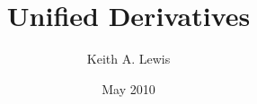 \documentclass[11pt]{amsbook}
\begin{document}
 

\author{Keith A. Lewis} 
\title{Unified Derivatives} 
\date{May 2010} 

\frontmatter 
\tableofcontents 
 

\mainmatter 






\backmatter 
% 
% 
\end{document}
